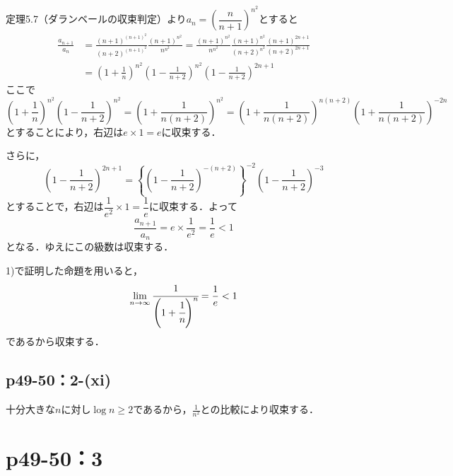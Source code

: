 \documentclass[a4paper,10pt,fleqn]{ltjsarticle}
\begin{document}
        \begin{screen}
        定理5.7（ダランベールの収束判定）より$a_n=\left(\dfrac{n}{n+1}\right)^{n^2}$とすると
        \begin{align*}
        \frac{a_{n+1}}{a_n}&=\frac{(n+1)^{(n+1)^2}}{(n+2)^{(n+1)^2}}\frac{(n+1)^{n^2}}{n^{n^2}}=\frac{(n+1)^{n^2}}{n^{n^2}}\frac{(n+1)^{n^2}}{(n+2)^{n^2}}\frac{(n+1)^{2n+1}}{(n+2)^{2n+1}}\\
        &=\left(1+\frac{1}{n}\right)^{n^2}\left(1-\frac{1}{n+2}\right)^{n^2}\left(1-\frac{1}{n+2}\right)^{2n+1}
        \end{align*}
        ここで
        \[
        \left(1+\frac{1}{n}\right)^{n^2}\left(1-\frac{1}{n+2}\right)^{n^2}=\left(1+\frac{1}{n(n+2)}\right)^{n^2}=\left(1+\frac{1}{n(n+2)}\right)^{n(n+2)}\left(1+\frac{1}{n(n+2)}\right)^{-2n}
        \]
        とすることにより，右辺は$e \times 1=e$に収束する．
        
        さらに，
        \[
        \left(1-\frac{1}{n+2}\right)^{2n+1}=\left\{\left(1-\frac{1}{n+2}\right)^{-(n+2)}\right\}^{-2}\left(1-\frac{1}{n+2}\right)^{-3}
        \]
        とすることで，右辺は$\dfrac{1}{e^2} \times 1=\dfrac{1}{e}$に収束する．よって
        \[
        \frac{a_{n+1}}{a_n}=e \times \frac{1}{e^2}=\frac{1}{e}<1
        \]
        となる．ゆえにこの級数は収束する．
    \end{screen}


    \begin{screen}
    1)で証明した命題を用いると，
    \[
      \lim _{n \to \infty} \cfrac{1}{\Bigg(1+\cfrac{1}{n}\Bigg)^n} = \frac{1}{e} < 1
    \]
    であるから収束する．
\end{screen}


\subsection*{p49-50：2-(xi)}


\begin{screen}
十分大きな$n$に対し$\log n \geq 2$であるから，$\frac{1}{n^2}$との比較により収束する．
\end{screen}

\newpage 

    \section*{p49-50：3}
\end{document}
